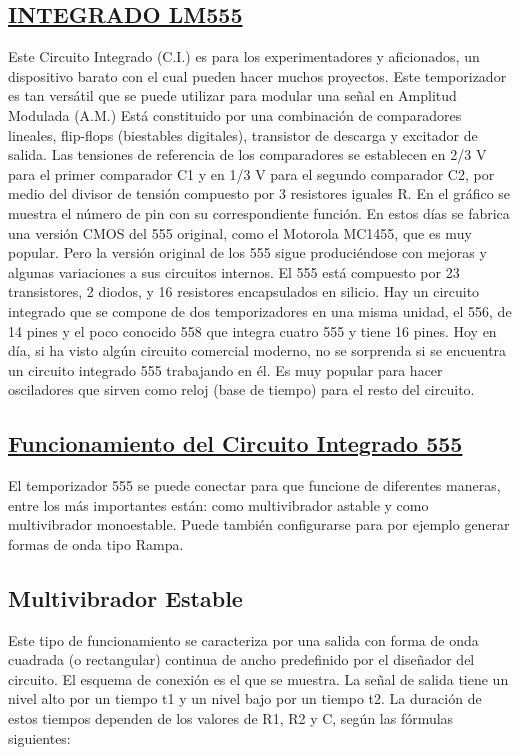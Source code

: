 \documentclass[a4paper,11pt]{article}
\begin{document}
\subsection{\underline{INTEGRADO LM555}}
Este Circuito Integrado (C.I.) es para los experimentadores y aficionados, un dispositivo barato con el cual pueden hacer muchos proyectos. Este temporizador es tan versátil que se puede utilizar para modular una señal en Amplitud Modulada (A.M.)
Está constituido por una combinación de comparadores lineales, flip-flops (biestables digitales), transistor de descarga y excitador de salida.
Las tensiones de referencia de los comparadores se establecen en 2/3 V para el primer comparador C1 y en 1/3 V para el segundo comparador C2, por medio del divisor de tensión compuesto por 3 resistores iguales R. En el gráfico se muestra el número de pin con su correspondiente función.
En estos días se fabrica una versión CMOS del 555 original, como el Motorola MC1455, que es muy popular. Pero la versión original de los 555 sigue produciéndose con mejoras y algunas variaciones a sus circuitos internos. El 555 está compuesto por 23 transistores, 2 diodos, y 16 resistores encapsulados en silicio. Hay un circuito integrado que se compone de dos temporizadores en una misma unidad, el 556, de 14 pines y el poco conocido 558 que integra cuatro 555 y tiene 16 pines.
Hoy en día, si ha visto algún circuito comercial moderno, no se sorprenda si se encuentra un circuito integrado 555 trabajando en él. Es muy popular para hacer osciladores que sirven como reloj (base de tiempo) para el resto del circuito.

\subsection{\underline{Funcionamiento del Circuito Integrado 555}}
El temporizador 555 se puede conectar para que funcione de diferentes maneras, entre los más importantes están: como multivibrador astable y como multivibrador monoestable. Puede también configurarse para por ejemplo generar formas de onda tipo Rampa.

\subsection{Multivibrador Estable}
Este tipo de funcionamiento se caracteriza por una salida con forma de onda cuadrada (o rectangular) continua de ancho predefinido por el diseñador del circuito. El esquema de conexión es el que se muestra. La señal de salida tiene un nivel alto por un tiempo t1 y un nivel bajo por un tiempo t2. La duración de estos tiempos dependen de los valores de R1, R2 y C, según las fórmulas siguientes:
\end{document}

